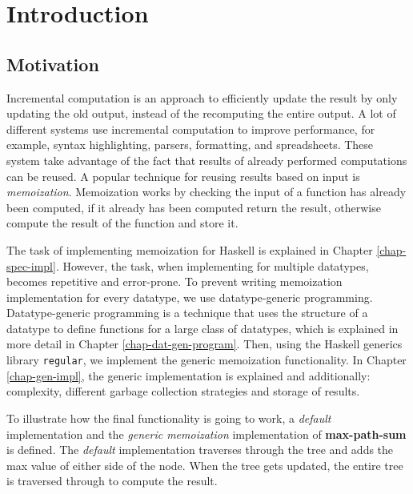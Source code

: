 \chapter{Introduction}


\section{Motivation}
Incremental computation is an approach to efficiently update the result by only updating the old output, instead of the recomputing the entire output. A lot of different systems use incremental computation to improve performance, for example, syntax highlighting, parsers, formatting, and spreadsheets. These system take advantage of the fact that results of already performed computations can be reused. A popular technique for reusing results based on input is \textit{memoization}. Memoization works by checking the input of a function has already been computed, if it already has been computed return the result, otherwise compute the result of the function and store it. 

The task of implementing memoization for Haskell is explained in Chapter \ref*{chap-spec-impl}. However, the task, when implementing for multiple datatypes, becomes repetitive and error-prone. To prevent writing memoization implementation for every datatype, we use datatype-generic programming. Datatype-generic programming is a technique that uses the structure of a datatype to define functions for a large class of datatypes, which is explained in more detail in Chapter \ref*{chap-dat-gen-program}. Then, using the Haskell generics library \texttt{regular}, we implement the generic memoization functionality. In Chapter \ref*{chap-gen-impl}, the generic implementation is explained and additionally: complexity, different garbage collection strategies and storage of results. 

To illustrate how the final functionality is going to work, a \textit{default} implementation  and the \textit{generic memoization} implementation of \textbf{max-path-sum} is defined. The \textit{default} implementation traverses through the tree and adds the max value of either side of the node. When the tree gets updated, the entire tree is traversed through to compute the result.

